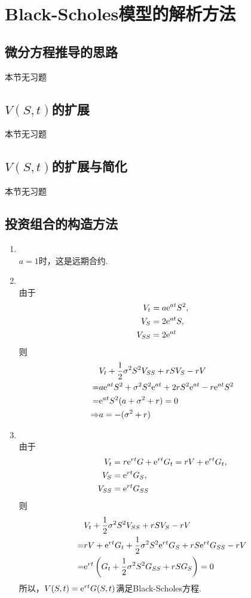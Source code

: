 \section{Black-Scholes模型的解析方法}
\subsection{微分方程推导的思路}
本节无习题
\subsection{$V(S,t)$的扩展}
本节无习题
\subsection{$V(S,t)$的扩展与简化}
本节无习题
\subsection{投资组合的构造方法}
\begin{enumerate}
    \item \sol\\ $a=1$时，这是远期合约.
    \item \pro\\
    由于
    \begin{align*}
        V_t & = a\mathrm{e}^{at}S^2,\\
        V_S & = 2\mathrm{e}^{at}S,\\
        V_{SS} & = 2\mathrm{e}^{at}
    \end{align*}
    则
    \begin{align*}
        & V_t+\frac{1}{2}\sigma^2S^2V_{SS}+rSV_S - rV\\
        =&a\mathrm{e}^{at}S^2+\sigma^2S^2\mathrm{e}^{at}+2rS^2\mathrm{e}^{at}-r\mathrm{e}^{at}S^2\\
        =&\mathrm{e}^{at}S^2(a+\sigma^2+r)=0\\
        \Rightarrow & a = -(\sigma^2+r)
    \end{align*}
    \item \pro\\
    由于
    \begin{align*}
        V_t & = r\mathrm{e}^{rt}G+\mathrm{e}^{rt}G_t = rV+\mathrm{e}^{rt}G_t,\\
        V_S & = \mathrm{e}^{rt}G_S,\\
        V_{SS} & = \mathrm{e}^{rt}G_{SS}
    \end{align*}
    则
    \begin{align*}
        & V_t+\frac{1}{2}\sigma^2S^2V_{SS}+rSV_S - rV\\
        =&rV+\mathrm{e}^{rt}G_t+\frac{1}{2}\sigma^2S^2\mathrm{e}^{rt}G_S+rS\mathrm{e}^{rt}G_{SS}-rV\\
        =&\mathrm{e}^{rt}\left(G_t+\frac{1}{2}\sigma^2S^2G_{SS}+rSG_S\right)=0
    \end{align*}
    所以，$V(S,t)=\mathrm{e}^{rt}G(S,t)$满足Black-Scholes方程.
\end{enumerate}
